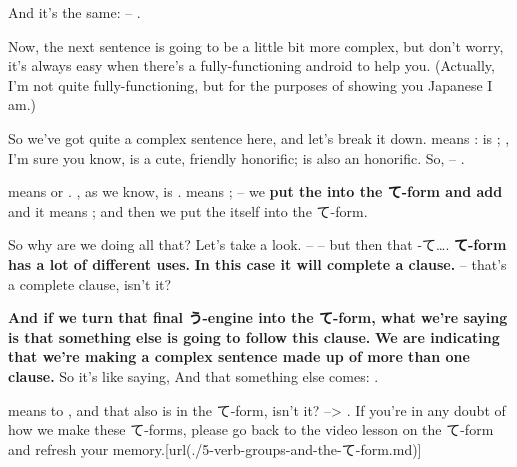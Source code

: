 {}

And it's the same:  -- .


{}

Now, the next sentence is going to be a little bit more complex, but don't worry, it's always easy when there's a fully-functioning android to help you. (Actually, I'm not quite fully-functioning, but for the purposes of showing you Japanese I am.)


{}

So we've got quite a complex sentence here, and let's break it down.  means :  is ; , I'm sure you know, is a cute, friendly honorific;  is also an honorific. So,  -- .

 means  or . , as we know, is .  means ;  -- we {\bf put the  into the て-form and add } and it means ; and then we put the  itself into the て-form.

So why are we doing all that? Let's take a look.  -- -- but then that -て\ldots{}. {\bf て-form has a lot of different uses.} {\bf In this case it will complete a clause.}  -- that's a complete clause, isn't it?

{}

{\bf And if we turn that final う-engine into the て-form, what we're saying is that something else is going to follow this clause.} {\bf We are indicating that we're making a complex sentence made up of more than one clause.} So it's like saying,  And that something else comes: .

{}

 means to , and that also is in the て-form, isn't it?  --> . If you're in any doubt of how we make these て-forms, please go back to the video lesson on the て-form and refresh your memory.\goto{{[}5{]}}[url(./5-verb-groups-and-the-て-form.md)]

